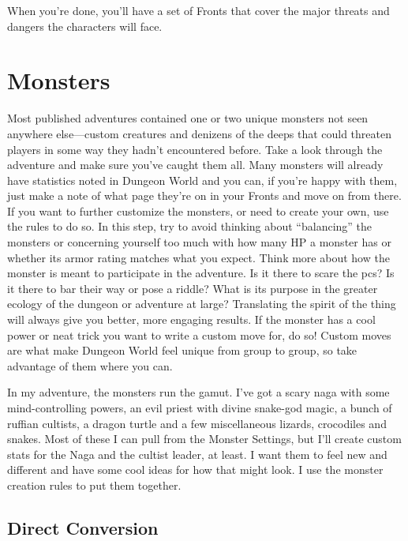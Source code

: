  

When you’re done, you’ll have a set of Fronts that cover the major threats and dangers the characters will face.

 
\section{Monsters}   
 

Most published adventures contained one or two unique monsters not seen anywhere else—custom creatures and denizens of the deeps that could threaten players in some way they hadn’t encountered before. Take a look through the adventure and make sure you’ve caught them all. Many monsters will already have statistics noted in Dungeon World and you can, if you’re happy with them, just make a note of what page they’re on in your Fronts and move on from there. If you want to further customize the monsters, or need to create your own, use the rules to do so. In this step, try to avoid thinking about “balancing” the monsters or concerning yourself too much with how many HP a monster has or whether its armor rating matches what you expect. Think more about how the monster is meant to participate in the adventure. Is it there to scare the pcs? Is it there to bar their way or pose a riddle? What is its purpose in the greater ecology of the dungeon or adventure at large? Translating the spirit of the thing will always give you better, more engaging results. If the monster has a cool power or neat trick you want to write a custom move for, do so! Custom moves are what make Dungeon World feel unique from group to group, so take advantage of them where you can.

 
\startExample
In my adventure, the monsters run the gamut. I’ve got a scary naga with some mind-controlling powers, an evil priest with divine snake-god magic, a bunch of ruffian cultists, a dragon turtle and a few miscellaneous lizards, crocodiles and snakes. Most of these I can pull from the Monster Settings, but I’ll create custom stats for the Naga and the cultist leader, at least. I want them to feel new and different and have some cool ideas for how that might look. I use the monster creation rules to put them together.
\stopExample
 
\subsection{Direct Conversion}    
 

